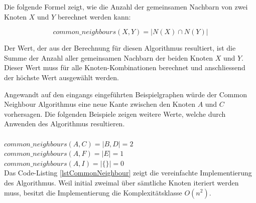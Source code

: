 Die folgende Formel zeigt, wie die Anzahl der gemeinsamen Nachbarn von zwei Knoten $X$ und $Y$ berechnet werden kann:

\begin{equation}
\label{eq:cn}
    common\_neighbours(X,Y) = | N(X) \cap N(Y) |
\end{equation}

Der Wert, der aus der Berechnung für diesen Algorithmus resultiert, ist die Summe der Anzahl aller gemeinsamen
Nachbarn der beiden Knoten $X$ und $Y$. Dieser Wert muss für alle Knoten-Kombinationen berechnet und anschliessend der höchste
Wert ausgewählt werden.

Angewandt auf den eingangs eingeführten Beispielgraphen würde der Common Neighbour Algorithmus eine neue Kante zwischen den Knoten $A$ und $C$ vorhersagen.
Die folgenden Beispiele zeigen weitere Werte, welche durch Anwenden des Algorithmus resultieren.\\
\\
\vspace{4mm}
\newcommand{\forceindent}{\leavevmode{\parindent=2em\indent}}
\forceindent $common\_neighbours(A,C) = |{B, D}| = 2$\\
\vspace{4mm}
\forceindent $common\_neighbours(A,F) = |{E}| = 1$\\
\vspace{4mm}
\forceindent $common\_neighbours(A,I) = |{\{\}}| = 0$\\

Das Code-Listing \ref{lstCommonNeighbour} zeigt die vereinfachte Implementierung des Algorithmus.
Weil initial zweimal über sämtliche Knoten iteriert werden muss, besitzt die Implementierung die Komplexitätsklasse $O(n^2)$.

